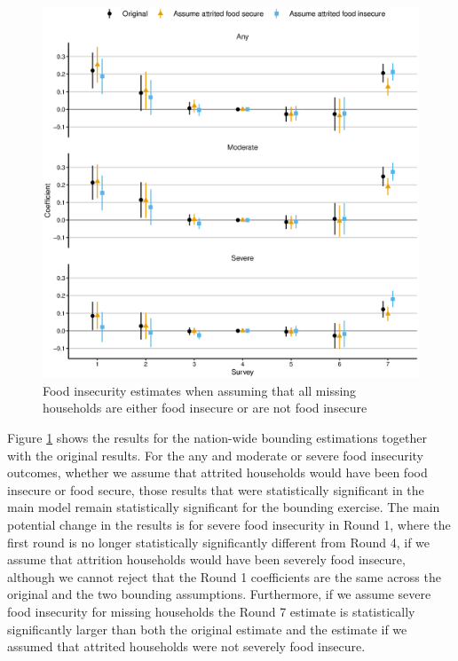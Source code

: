 \documentclass{wber}
\begin{document}
\begin{figure}
\caption{Food insecurity estimates when assuming that all missing
households are either food insecure or are not food
insecure}\label{fig:attrition}
\begin{center}
\includegraphics[width=\linewidth, keepaspectratio]{./eps/fig_07.eps}
\end{center}
\end{figure}

Figure \ref{fig:attrition} shows the results for the nation-wide bounding
estimations together with the original results. For the any and moderate
or severe food insecurity outcomes, whether we assume that attrited
households would have been food insecure or food secure, those results
that were statistically significant in the main model remain
statistically significant for the bounding exercise. The main potential
change in the results is for severe food insecurity in Round 1, where
the first round is no longer statistically significantly different from
Round 4, if we assume that attrition households would have been severely
food insecure, although we cannot reject that the Round 1 coefficients
are the same across the original and the two bounding assumptions.
Furthermore, if we assume severe food insecurity for missing households
the Round 7 estimate is statistically significantly larger than both the
original estimate and the estimate if we assumed that attrited
households were not severely food insecure.
\end{document}
